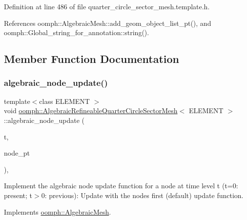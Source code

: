 Definition at line 486 of file quarter\+\_\+circle\+\_\+sector\+\_\+mesh.\+template.\+h.



References oomph\+::\+Algebraic\+Mesh\+::add\+\_\+geom\+\_\+object\+\_\+list\+\_\+pt(), and oomph\+::\+Global\+\_\+string\+\_\+for\+\_\+annotation\+::string().



\subsection{Member Function Documentation}
\mbox{\label{classoomph_1_1AlgebraicRefineableQuarterCircleSectorMesh_ac591df8f18ad687e1dc9b70b731c2de1}} 
\subsubsection{\texorpdfstring{algebraic\+\_\+node\+\_\+update()}{algebraic\_node\_update()}}
{\footnotesize\ttfamily template$<$class E\+L\+E\+M\+E\+NT $>$ \\
void \hyperlink{classoomph_1_1AlgebraicRefineableQuarterCircleSectorMesh}{oomph\+::\+Algebraic\+Refineable\+Quarter\+Circle\+Sector\+Mesh}$<$ E\+L\+E\+M\+E\+NT $>$\+::algebraic\+\_\+node\+\_\+update (\begin{DoxyParamCaption}\item[{const unsigned \&}]{t,  }\item[{\hyperlink{classoomph_1_1AlgebraicNode}{Algebraic\+Node} $\ast$\&}]{node\+\_\+pt }\end{DoxyParamCaption})\hspace{0.3cm}{\ttfamily [inline]}, {\ttfamily [virtual]}}



Implement the algebraic node update function for a node at time level t (t=0\+: present; t$>$0\+: previous)\+: Update with the node\textquotesingle{}s first (default) update function. 



Implements \hyperlink{classoomph_1_1AlgebraicMesh_ab01d6f93354f3c4e5c9d1f0a5885a65b}{oomph\+::\+Algebraic\+Mesh}.




